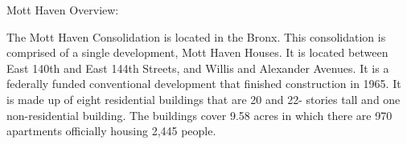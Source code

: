 Mott Haven Overview:     

   

The Mott Haven Consolidation is located in the Bronx. This consolidation is comprised of a single development, Mott Haven Houses. It is located between East 140th and East 144th Streets, and Willis and Alexander Avenues. It is a federally funded conventional development that finished construction in 1965. It is made up of eight residential buildings that are 20 and 22- stories tall and one non-residential building. The buildings cover 9.58 acres in which there are 970 apartments officially housing 2,445 people. 
